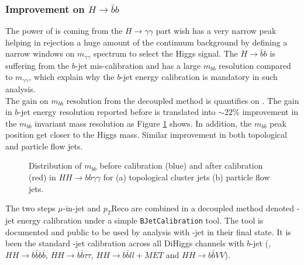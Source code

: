 \subsubsection{Improvement on $H\rightarrow\bar{b}b$}
 The power of \HHyybb is coming from the $H\rightarrow\gamma\gamma$ part wish has a very narrow peak helping in rejection a huge amount of the continuum background by defining a narrow windows on $m_{\gamma\gamma}$ spectrum to select the Higgs signal. The $H\rightarrow\bar{b}b$ is suffering from the $b$-jet mis-calibration and has a large $m_{bb}$ resolution compared to $m_{\gamma\gamma}$, which explain why the $b$-jet energy calibration is  mandatory in such analysis.\\
The gain on $m_{bb}$ resolution from the decoupled method is quantifies on \HHyybb. The gain in $b$-jet energy resolution reported before is translated into $\sim$22\% improvement in the $m_{bb}$ invariant mass resolution as Figure \ref{fig:Jet:Cal:BCal:Result:mbb} shows. In addition, the $m_{bb}$ peak position get closer to the Higgs mass. Similar improvement in both topological and particle flow jets. 
\begin{figure}[htbp]
   \centering
   \quad
   \caption{Distribution of $m_{bb}$ before calibration (blue) and after calibration (red) in $HH\rightarrow bb\gamma\gamma$ for (a) topological cluster jets (b) particle flow jets.}
   \label{fig:Jet:Cal:BCal:Result:mbb}
\end{figure}
The two steps $\mu$-in-jet and $p_T$Reco are combined in a decoupled method denoted \bq-jet energy calibration under a simple \texttt{BJetCalibration} tool. The tool is documented and public to be used by analysis with \bq-jet in their final state. It is been the standard \bq-jet calibration across all DiHiggs channels with $b$-jet (\HHyybb, $HH\rightarrow b\bar{b}b\bar{b}$, $HH\rightarrow b\bar{b}\tau\tau$,  $HH\rightarrow b\bar{b}ll+MET$ and $HH\rightarrow b\bar{b}VV$).
